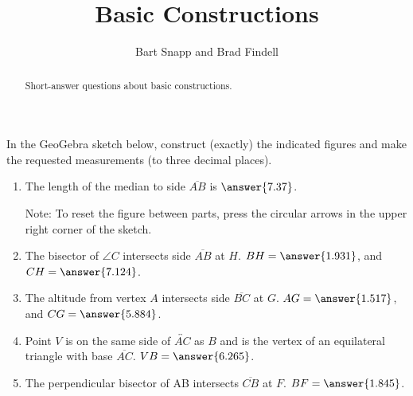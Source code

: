 \documentclass[nooutcomes]{ximera}
\title{Basic Constructions}
\author{Bart Snapp and Brad Findell}
\begin{document}
\begin{abstract}
Short-answer questions about basic constructions. 
\end{abstract}
\maketitle

\begin{problem}
In the GeoGebra sketch below, construct (exactly) the indicated figures 
and make the requested measurements (to three decimal places).  

\begin{center}  
\end{center}
\begin{enumerate}
\item The length of the median to side $\overline{AB}$ 
is $\answer{7.37}$.  

Note: To reset the figure between parts, press the circular arrows in the upper right corner of the sketch.   

\item The bisector of $\angle C$ intersects side $\overline{AB}$ at $H$.  
$BH =  \answer{1.931}$, and $CH = \answer{7.124}$.  

\item The altitude from vertex $A$ intersects side $\overline{BC}$ at $G$.
$AG = \answer{1.517}$, and 
$CG = \answer{5.884}$.  

\item Point $V$ is on the same side of $\overleftrightarrow{AC}$ as $B$ and is the vertex of an equilateral triangle with base $\overline{AC}$.  
$VB = \answer{6.265}$. 

\item The perpendicular bisector of AB intersects $\overline{CB}$ at $F$.  
$BF = \answer{1.845}$.
\end{enumerate}

\end{problem}
\end{document}
